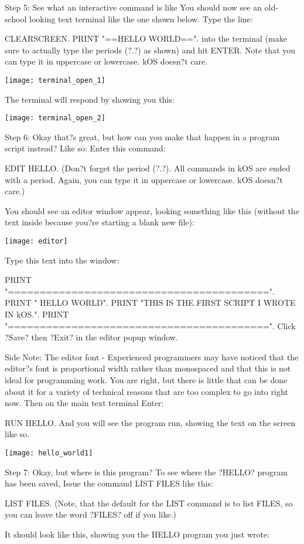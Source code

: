 Step 5: See what an interactive command is like
You should now see an old-school looking text terminal like the one shown below. Type the line:

CLEARSCREEN. PRINT "==HELLO WORLD==".
into the terminal (make sure to actually type the periods (?.?) as shown) and hit ENTER. Note that you can type it in uppercase or lowercase. kOS doesn?t care.

\texttt{[image: terminal\_open\_1]}

The terminal will respond by showing you this:

\texttt{[image: terminal\_open\_2]}

Step 6: Okay that?s great, but how can you make that happen in a program script instead?
Like so: Enter this command:

EDIT HELLO.
(Don?t forget the period (?.?). All commands in kOS are ended with a period. Again, you can type it in uppercase or lowercase. kOS doesn?t care.)

You should see an editor window appear, looking something like this (without the text inside because you?re starting a blank new file):

\texttt{[image: editor]}

Type this text into the window:

PRINT "=========================================".
PRINT "      HELLO WORLD".
PRINT "THIS IS THE FIRST SCRIPT I WROTE IN kOS.".
PRINT "=========================================".
Click ?Save? then ?Exit? in the editor popup window.

Side Note: The editor font - Experienced programmers may have noticed that the editor?s font is proportional width rather than monospaced and that this is not ideal for programming work. You are right, but there is little that can be done about it for a variety of technical reasons that are too complex to go into right now.
Then on the main text terminal Enter:

RUN HELLO.
And you will see the program run, showing the text on the screen like so.

\texttt{[image: hello\_world1]}

Step 7: Okay, but where is this program?
To see where the ?HELLO? program has been saved, Issue the command LIST FILES like this:

LIST FILES.
(Note, that the default for the LIST command is to list FILES, so you can leave the word ?FILES? off if you like.)

It should look like this, showing you the HELLO program you just wrote:

